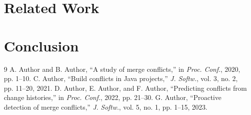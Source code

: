 \section{Related Work}
{\sizeofsections\lipsum[37-48]\par}

\section{Conclusion}
\lipsum[49-54]

\begin{thebibliography}{9}
 A. Author and B. Author, ``A study of merge conflicts,'' in \emph{Proc. Conf.}, 2020, pp. 1--10.
 C. Author, ``Build conflicts in Java projects,'' \emph{J. Softw.}, vol. 3, no. 2, pp. 11--20, 2021.
 D. Author, E. Author, and F. Author, ``Predicting conflicts from change histories,'' in
\emph{Proc. Conf.}, 2022, pp. 21--30.
 G. Author, ``Proactive detection of merge conflicts,'' \emph{J. Softw.}, vol. 5, no. 1, pp. 1--15,
2023.
\end{thebibliography}
